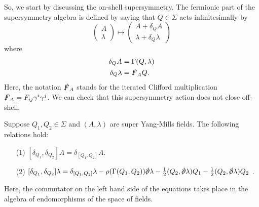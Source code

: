 \documentclass[10pt, oneside]{article}
\begin{document}
So, we start by discussing the on-shell supersymmetry.  The fermionic part of the supersymmetry algebra is defined by saying that $Q \in \Sigma$ acts infinitesimally by
\[
\begin{pmatrix}
A \\ \lambda
\end{pmatrix}
\mapsto
\begin{pmatrix} A + \delta_Q A \\
\lambda + \delta_Q \lambda
\end{pmatrix}
\]
where 
\begin{align*}
\delta_Q A &= \Gamma(Q,\lambda) \\
\delta_Q \lambda &= \slashed{F}_A Q .
\end{align*}
Here, the notation $\slashed{F}_A$ stands for the iterated Clifford multiplication $\slashed{F}_A = F_{ij} \gamma^i \gamma^j$.  We can check that this supersymmetry action does not close off-shell.  

\begin{lemma} \label{onshell_action_lemma}
Suppose $Q_1, Q_2 \in \Sigma$ and $(A, \lambda)$ are super Yang-Mills fields.
The following relations hold:
\begin{itemize}
\item[(1)] \label{10dsusyA} $ [\delta_{Q_1}, \delta_{Q_2}] A = \delta_{[Q_1, Q_2]} A$.
\item[(2)] \label{10dsusyL} $ [\delta_{Q_1}, \delta_{Q_2}] \lambda = \delta_{[Q_1,Q_2]} \lambda - \rho(\Gamma(Q_1,Q_2)) \sd \dd \lambda - \frac 12(Q_2, \sd \dd \lambda)Q_1 - \frac 12(Q_2, \sd \dd \lambda)Q_2$ .
\end{itemize}
Here, the commutator on the left hand side of the equations takes place in the algebra of endomorphisms of the space of fields.
\end{lemma}
\end{document}
